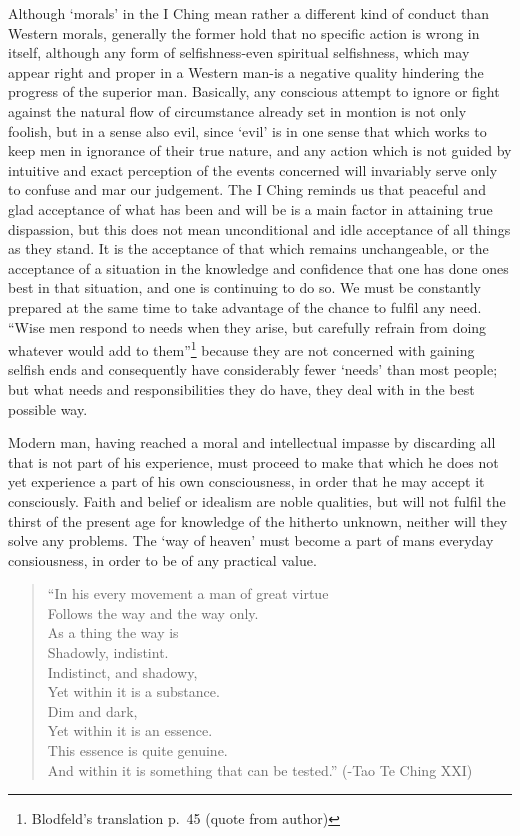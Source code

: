 \documentclass[11pt]{book}
\begin{document}
Although `morals' in the I Ching mean rather a different kind of conduct than Western morals, generally the former hold that no specific action is wrong in itself, although any form of selfishness-even spiritual selfishness, which may appear right and proper in a Western man-is a negative quality hindering the progress of the superior man. Basically, any conscious attempt to ignore or fight against the natural flow of circumstance already set in montion is not only foolish, but in a sense also evil, since `evil' is in one sense that which works to keep men in ignorance of their true nature, and any action which is not guided by intuitive and exact perception of the events concerned will invariably serve only to confuse and mar our judgement. The I Ching reminds us that peaceful and glad acceptance of what has been and will be is a main factor in attaining true dispassion, but this does not mean unconditional and idle acceptance of all things as they stand. It is the acceptance of that which remains unchangeable, or the acceptance of a situation in the knowledge and confidence that one has done ones best in that situation, and one is continuing to do so. We must be constantly prepared at the same time to take advantage of the chance to fulfil any need. ``Wise men respond to needs when they arise, but carefully refrain from doing whatever would add to them''\footnote{Blodfeld's translation p.~45 (quote from author)} because they are not concerned with gaining selfish ends and consequently have considerably fewer `needs' than most people; but what needs and responsibilities they do have, they deal with in the best possible way.

Modern man, having reached a moral and intellectual impasse by discarding all that is not part of his experience, must proceed to make that which he does not yet experience a part of his own consciousness, in order that he may accept it consciously. Faith and belief or idealism are noble qualities, but will not fulfil the thirst of the present age for knowledge of the hitherto unknown, neither will they solve any problems. The `way of heaven' must become a part of mans everyday consiousness, in order to be of any practical value.

\begin{quote}
``In his every movement a man of great virtue\\
Follows the way and the way only.\\
As a thing the way is\\
Shadowly, indistint.\\
Indistinct, and shadowy,\\
Yet within it is a substance.\\
Dim and dark,\\
Yet within it is an essence.\\
This essence is quite genuine.\\
And within it is something that can be tested.'' (-Tao Te Ching XXI)
\end{quote}
\end{document}
